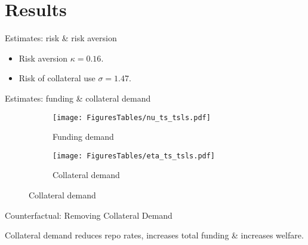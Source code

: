 \documentclass{beamer}
\begin{document}


\section{Results}

\begin{frame}{Estimates: risk \& risk aversion}\label{frame:results}


\begin{itemize}
\item Risk aversion $\kappa=0.16$.
\item Risk of collateral use $\sigma=1.47$. \hyperlink{frame:firstStage}{}    
\end{itemize}

\end{frame}


\begin{frame}{Estimates: funding \& collateral demand}
\begin{figure}[t]
\centering
\begin{subfigure}{.48\textwidth}
   \centering
            \texttt{[image: FiguresTables/nu\_ts\_tsls.pdf]}
            \caption{Funding demand}
            \label{fig:nu_ts}
\end{subfigure}
\hfill
\begin{subfigure}{.48\textwidth}
   \centering
            \texttt{[image: FiguresTables/eta\_ts\_tsls.pdf]}
            \caption{Collateral demand}
            \label{fig:eta_ts}
\end{subfigure}
\end{figure}
\end{frame}





\begin{frame}{Counterfactual: Removing Collateral Demand}


Collateral demand reduces repo rates, increases total funding \& increases welfare.

\end{frame}
\end{document}
